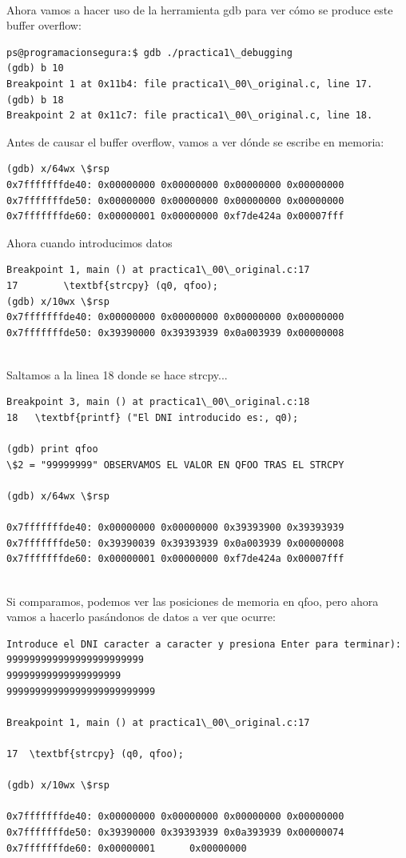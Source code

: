 \\
\newpage
\noindent Ahora vamos a hacer uso de la herramienta gdb para ver cómo se produce este buffer overflow:
\begin{verbatim}
ps@programacionsegura:$ gdb ./practica1\_debugging
(gdb) b 10 
Breakpoint 1 at 0x11b4: file practica1\_00\_original.c, line 17. 
(gdb) b 18 
Breakpoint 2 at 0x11c7: file practica1\_00\_original.c, line 18.
\end{verbatim}
\noindent Antes de causar el buffer overflow, vamos a ver dónde se escribe en memoria:
\begin{verbatim}
(gdb) x/64wx \$rsp 
0x7fffffffde40: 0x00000000 0x00000000 0x00000000 0x00000000 
0x7fffffffde50: 0x00000000 0x00000000 0x00000000 0x00000000 
0x7fffffffde60: 0x00000001 0x00000000 0xf7de424a 0x00007fff 

\end{verbatim}
\noindent Ahora cuando introducimos datos
\begin{verbatim}
Breakpoint 1, main () at practica1\_00\_original.c:17 
17        \textbf{strcpy} (q0, qfoo); 
(gdb) x/10wx \$rsp 
0x7fffffffde40: 0x00000000 0x00000000 0x00000000 0x00000000 
0x7fffffffde50: 0x39390000 0x39393939 0x0a003939 0x00000008 
    
\end{verbatim}
\noindent Saltamos a la linea 18 donde se hace strcpy...

\begin{verbatim}
Breakpoint 3, main () at practica1\_00\_original.c:18 
18   \textbf{printf} ("El DNI introducido es:, q0); 

(gdb) print qfoo 
\$2 = "99999999" OBSERVAMOS EL VALOR EN QFOO TRAS EL STRCPY

(gdb) x/64wx \$rsp 

0x7fffffffde40: 0x00000000 0x00000000 0x39393900 0x39393939 
0x7fffffffde50: 0x39390039 0x39393939 0x0a003939 0x00000008 
0x7fffffffde60: 0x00000001 0x00000000 0xf7de424a 0x00007fff 
 
\end{verbatim}
\noindent Si comparamos, podemos ver las posiciones de memoria en qfoo, pero ahora vamos a hacerlo pasándonos de datos a ver que ocurre:

\begin{verbatim}
Introduce el DNI caracter a caracter y presiona Enter para terminar): 
999999999999999999999999
99999999999999999999
99999999999999999999999999 

Breakpoint 1, main () at practica1\_00\_original.c:17 

17  \textbf{strcpy} (q0, qfoo); 

(gdb) x/10wx \$rsp 

0x7fffffffde40: 0x00000000 0x00000000 0x00000000 0x00000000 
0x7fffffffde50: 0x39390000 0x39393939 0x0a393939 0x00000074 
0x7fffffffde60: 0x00000001      0x00000000

\end{verbatim}

